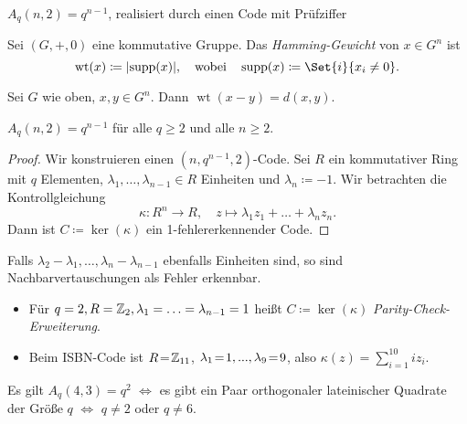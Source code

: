 \documentclass{cheat-sheet}
\DeclareMathOperator{\wt}{wt} %
\begin{document}
\begin{satz}
  $A_q(n, 2) = q^{n-1}$, realisiert durch einen Code mit Prüfziffer
\end{satz}


% 
\begin{defn}
  Sei $(G, +, 0)$ eine kommutative Gruppe.
  Das \emph{Hamming-Gewicht} von $x \in G^n$ ist
  \[
    \wt(x) \coloneqq \abs{\supp(x)},
    \quad \text{wobei} \quad
    \supp(x) \coloneqq \Set{i}{x_i \neq 0}.
  \]
\end{defn}

\begin{lem}
  Sei $G$ wie oben, $x, y \in G^n$.
  Dann $\wt(x-y) = d(x, y)$.
\end{lem}

\begin{satz}
  $A_q(n, 2) = q^{n-1}$ für alle $q \geq 2$ und alle $n \geq 2$.
\end{satz}

\begin{proof}
  Wir konstruieren einen $(n, q^{n-1}, 2)$-Code.
  Sei $R$ ein kommutativer Ring mit $q$ Elementen, $\lambda_1, \ldots, \lambda_{n-1} \in R$ Einheiten und $\lambda_n \coloneqq -1$. Wir betrachten die Kontrollgleichung
  \[
    \kappa : R^n \to R, \quad
    z \mapsto \lambda_1 z_1 + \ldots + \lambda_n z_n.
  \]
  Dann ist $C \coloneqq \ker(\kappa)$ ein 1-fehlererkennender Code.
\end{proof}

\begin{lem}
  Falls $\lambda_2 - \lambda_1, \ldots, \lambda_n - \lambda_{n-1}$ ebenfalls Einheiten sind, so sind Nachbarvertauschungen als Fehler erkennbar.
\end{lem}

\begin{bspe}
  \begin{itemize}
    \item Für $q=2, R=\mathbb{Z}_2, \lambda_1 = \ldots = \lambda_{n-1} = 1$ heißt $C \coloneqq \ker(\kappa)$ \emph{Parity-Check-Erweiterung}.
    \item Beim ISBN-Code ist $R \!=\! \mathbb{Z}_{11}$, $\lambda_1 \!=\! 1, ..., \lambda_9 \!=\! 9$, also $\kappa(z) = \sum_{i=1}^{10} i z_i$.
  \end{itemize}
\end{bspe}

\begin{bem}
  Es gilt $A_q(4,3) = q^2$ $\iff$ es gibt ein Paar orthogonaler lateinischer Quadrate der Größe $q$ $\iff$ $q \neq 2$ oder $q \neq 6$.
\end{bem}
\end{document}
